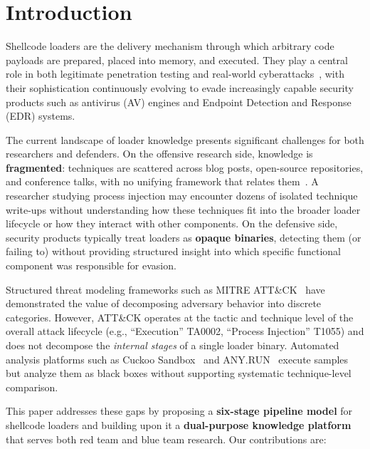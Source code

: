 \documentclass[10pt,a4paper,twocolumn]{article}
\begin{document}
\section{Introduction}

Shellcode loaders are the delivery mechanism through which arbitrary code payloads are prepared, placed into memory, and executed.
They play a central role in both legitimate penetration testing and real-world cyberattacks~\cite{mitre_execution}, with their sophistication continuously evolving to evade increasingly capable security products such as antivirus (AV) engines and Endpoint Detection and Response (EDR) systems.

The current landscape of loader knowledge presents significant challenges for both researchers and defenders.
On the offensive research side, knowledge is \textbf{fragmented}: techniques are scattered across blog posts, open-source repositories, and conference talks, with no unifying framework that relates them~\cite{loader_survey}.
A researcher studying process injection may encounter dozens of isolated technique write-ups without understanding how these techniques fit into the broader loader lifecycle or how they interact with other components.
On the defensive side, security products typically treat loaders as \textbf{opaque binaries}, detecting them (or failing to) without providing structured insight into which specific functional component was responsible for evasion.

Structured threat modeling frameworks such as MITRE ATT\&CK~\cite{mitre_attack} have demonstrated the value of decomposing adversary behavior into discrete categories.
However, ATT\&CK operates at the tactic and technique level of the overall attack lifecycle (e.g., ``Execution'' TA0002, ``Process Injection'' T1055) and does not decompose the \textit{internal stages} of a single loader binary.
Automated analysis platforms such as Cuckoo Sandbox~\cite{cuckoo} and ANY.RUN~\cite{anyrun} execute samples but analyze them as black boxes without supporting systematic technique-level comparison.

This paper addresses these gaps by proposing a \textbf{six-stage pipeline model} for shellcode loaders and building upon it a \textbf{dual-purpose knowledge platform} that serves both red team and blue team research.
Our contributions are:
\end{document}
